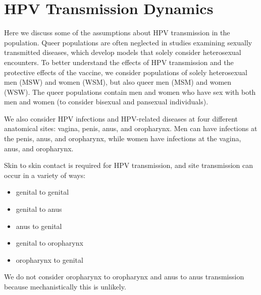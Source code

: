 \documentclass[12pt]{article}
\begin{document}
%
%
%
%

\section{HPV Transmission Dynamics}

Here we discuss some of the assumptions about HPV transmission in the population.  Queer populations are often neglected in studies examining sexually transmitted diseases, which develop models that solely consider heterosexual encounters.  To better understand the effects of HPV transmission and the protective effects of the vaccine, we consider populations of solely heterosexual men (MSW) and women (WSM), but also queer men (MSM) and women (WSW).  The queer populations contain men and women who have sex with both men and women (to consider bisexual and pansexual individuals).  

We also consider HPV infections and HPV-related diseases at four different anatomical sites: vagina, penis, anus, and oropharynx.  Men can have infections at the penis, anus, and oropharynx, while women have infections at the vagina, anus, and oropharynx.

Skin to skin contact is required for HPV transmission, and site transmission can occur in a variety of ways:
\begin{itemize}
\item genital to genital
\item genital to anus
\item anus to genital
\item genital to oropharynx
\item oropharynx to genital
\end{itemize}
We do not consider oropharynx to oropharynx and anus to anus transmission because mechanistically this is unlikely.  
\end{document}
